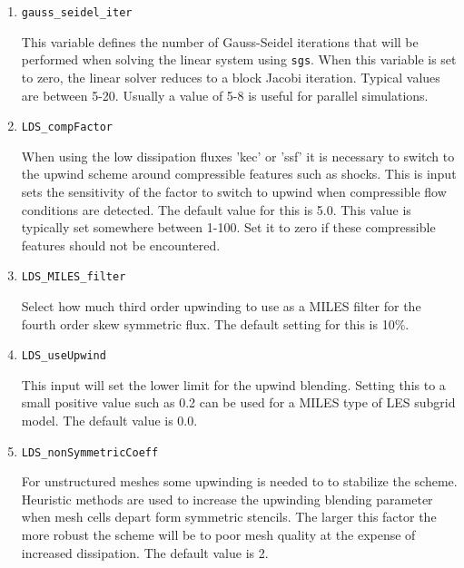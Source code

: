 \documentclass{article}
\begin{document}
\begin{enumerate}
\item {\tt gauss\_seidel\_iter}

  This variable defines the number of Gauss-Seidel iterations that
  will be performed when solving the linear system using {\tt sgs}.
  When this variable is set to zero, the linear solver reduces to a
  block Jacobi iteration.  Typical values are between 5-20.  Usually a
  value of 5-8 is useful for parallel simulations.





\item {\tt LDS\_compFactor}

  When using the low dissipation fluxes 'kec' or 'ssf' it is necessary
  to switch to the upwind scheme around compressible features such as
  shocks.  This is input sets the sensitivity of the factor to switch
  to upwind when compressible flow conditions are detected.  The
  default value for this is 5.0.  This value is typically set
  somewhere between 1-100.  Set it to zero if these compressible
  features should not be encountered.

\item {\tt LDS\_MILES\_filter}

  Select how much third order upwinding to use as a MILES filter for the fourth order skew symmetric flux.  The default setting for this is 10\%.

\item {\tt LDS\_useUpwind}

  This input will set the lower limit for the upwind blending.
  Setting this to a small positive value such as 0.2 can be used for a
  MILES type of LES subgrid model.  The default value is 0.0.

\item {\tt LDS\_nonSymmetricCoeff}

  For unstructured meshes some upwinding is needed to to stabilize the
  scheme.  Heuristic methods are used to increase the upwinding
  blending parameter when mesh cells depart form symmetric stencils.
  The larger this factor the more robust the scheme will be to poor
  mesh quality at the expense of increased dissipation. The default
  value is 2.


\end{enumerate}
\end{document}
